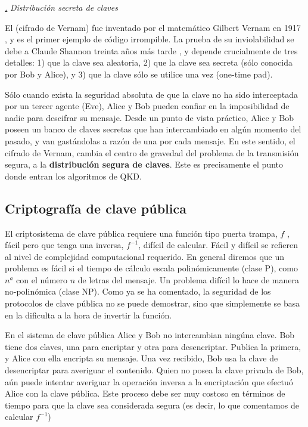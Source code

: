\documentclass[a4paper,11pt]{book} %
\numberwithin{equation}{chapter}
\def\subsubiContadorIt{\par\addtocounter{subsubsection}{1}\underline{\it\thesubsubsection.}\hskip0.5cm \setcounter{subsubsubsectionIt}{0}}
\newcommand{\SubsubiIt}[1]{
		\subsubiContadorIt \textit{#1}
	}
\newcounter{subsubsubsectionIt}[subsubsection]
\begin{document}
			\SubsubiIt{Distribución secreta de claves}
			
El (cifrado de Vernam) fue inventado por el matemático Gilbert Vernam en 1917 \cite{bib_Vernam-1926}, y es el primer ejemplo
de código irrompible. La prueba de su inviolabilidad se debe a Claude Shannon treinta años más tarde \cite{bib_Shannon-1949},
y depende crucialmente de tres detalles: 1) que la clave sea aleatoria, 2) que la clave sea secreta (sólo
conocida por Bob y Alice), y 3) que la clave sólo se utilice una vez (one-time pad).

Sólo cuando exista la seguridad absoluta de que la clave no ha sido interceptada por un tercer agente
(Eve), Alice y Bob pueden confiar en la imposibilidad de nadie para descifrar su mensaje. Desde un
punto de vista práctico, Alice y Bob poseen un banco de claves secretas que han intercambiado en algún
momento del pasado, y van gastándolas a razón de una por cada mensaje. En este sentido, el cifrado de
Vernam, cambia el centro de gravedad del problema de la transmisión segura, a la \textbf{distribución segura de
claves}. Este es precisamente el punto donde entran los algoritmos de QKD.


		\subsection{Criptografía de clave pública}

	El criptosistema de clave pública requiere una función tipo puerta trampa, $f$ , fácil pero que tenga una inversa, $f^{-1}$, difícil de calcular. Fácil y difícil se refieren al nivel de complejidad computacional requerido. En general diremos que un problema es fácil si el tiempo de cálculo escala polinómicamente (clase P), como $n^a$ con el número $n$ de letras del mensaje. Un problema difícil lo hace de manera no-polinómica (clase NP). Como ya se ha comentado, la seguridad de los protocolos de clave pública no se puede demostrar, sino que simplemente se basa en la dificulta a la hora de invertir la función. 
	
	En el sistema de clave pública Alice y Bob no intercambian ningúna clave. Bob tiene dos claves, una para encriptar y otra para desencriptar. Publica la primera, y Alice con ella encripta su mensaje.
Una vez recibido, Bob usa la clave de desencriptar para averiguar el contenido. Quien no posea la clave privada de Bob, aún puede intentar averiguar la operación inversa a la encriptación que efectuó Alice con la clave pública. Este proceso debe ser muy costoso en términos de tiempo para que la clave sea considerada segura (es decir, lo que comentamos de calcular $f^{-1}$)
\end{document}
